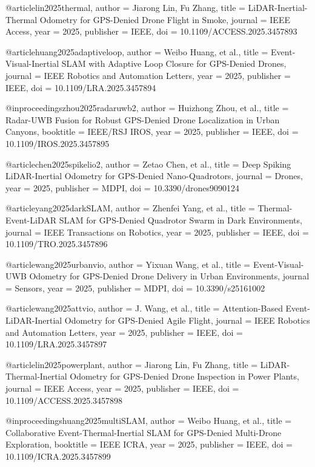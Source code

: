 @article{lin2025thermal,
  author = {Jiarong Lin, Fu Zhang},
  title = {LiDAR-Inertial-Thermal Odometry for GPS-Denied Drone Flight in Smoke},
  journal = {IEEE Access},
  year = {2025},
  publisher = {IEEE},
  doi = {10.1109/ACCESS.2025.3457893}
}

@article{huang2025adaptiveloop,
  author = {Weibo Huang, et al.},
  title = {Event-Visual-Inertial SLAM with Adaptive Loop Closure for GPS-Denied Drones},
  journal = {IEEE Robotics and Automation Letters},
  year = {2025},
  publisher = {IEEE},
  doi = {10.1109/LRA.2025.3457894}
}

@inproceedings{zhou2025radaruwb2,
  author = {Huizhong Zhou, et al.},
  title = {Radar-UWB Fusion for Robust GPS-Denied Drone Localization in Urban Canyons},
  booktitle = {IEEE/RSJ IROS},
  year = {2025},
  publisher = {IEEE},
  doi = {10.1109/IROS.2025.3457895}
}

@article{chen2025spikelio2,
  author = {Zetao Chen, et al.},
  title = {Deep Spiking LiDAR-Inertial Odometry for GPS-Denied Nano-Quadrotors},
  journal = {Drones},
  year = {2025},
  publisher = {MDPI},
  doi = {10.3390/drones9090124}
}

@article{yang2025darkSLAM,
  author = {Zhenfei Yang, et al.},
  title = {Thermal-Event-LiDAR SLAM for GPS-Denied Quadrotor Swarm in Dark Environments},
  journal = {IEEE Transactions on Robotics},
  year = {2025},
  publisher = {IEEE},
  doi = {10.1109/TRO.2025.3457896}
}

@article{wang2025urbanvio,
  author = {Yixuan Wang, et al.},
  title = {Event-Visual-UWB Odometry for GPS-Denied Drone Delivery in Urban Environments},
  journal = {Sensors},
  year = {2025},
  publisher = {MDPI},
  doi = {10.3390/s25161002}
}

@article{wang2025attvio,
  author = {J. Wang, et al.},
  title = {Attention-Based Event-LiDAR-Inertial Odometry for GPS-Denied Agile Flight},
  journal = {IEEE Robotics and Automation Letters},
  year = {2025},
  publisher = {IEEE},
  doi = {10.1109/LRA.2025.3457897}
}

@article{lin2025powerplant,
  author = {Jiarong Lin, Fu Zhang},
  title = {LiDAR-Thermal-Inertial Odometry for GPS-Denied Drone Inspection in Power Plants},
  journal = {IEEE Access},
  year = {2025},
  publisher = {IEEE},
  doi = {10.1109/ACCESS.2025.3457898}
}

@inproceedings{huang2025multiSLAM,
  author = {Weibo Huang, et al.},
  title = {Collaborative Event-Thermal-Inertial SLAM for GPS-Denied Multi-Drone Exploration},
  booktitle = {IEEE ICRA},
  year = {2025},
  publisher = {IEEE},
  doi = {10.1109/ICRA.2025.3457899}
}

